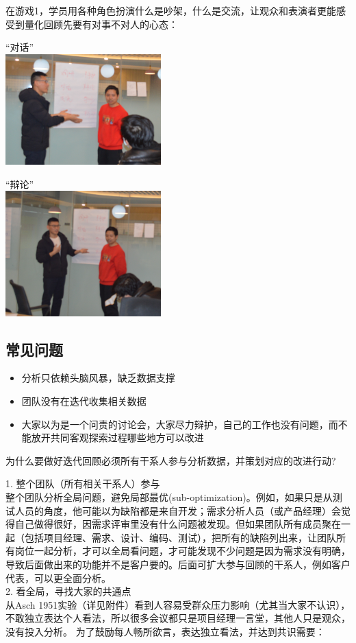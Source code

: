 在游戏1，学员用各种角色扮演什么是吵架，什么是交流，让观众和表演者更能感受到量化回顾先要有对事不对人的心态：

“对话”\\

\includegraphics[width=6cm]{1498.png}

“辩论” \\

\includegraphics[width=6cm]{1499.png}

\hypertarget{ux5e38ux89c1ux95eeux9898}{%
\subsection{常见问题}\label{ux5e38ux89c1ux95eeux9898}}

\begin{itemize}
\tightlist
\item
  分析只依赖头脑风暴，缺乏数据支撑
\item
  团队没有在迭代收集相关数据
\item
  大家以为是一个问责的讨论会，大家尽力辩护，自己的工作也没有问题，而不能放开共同客观探索过程哪些地方可以改进
\end{itemize}

为什么要做好迭代回顾必须所有干系人参与分析数据，并策划对应的改进行动?

1. 整个团队（所有相关干系人）参与\\
整个团队分析全局问题，避免局部最优(sub-optimization)。例如，如果只是从测试人员的角度，他可能以为缺陷都是来自开发；需求分析人员（或产品经理）会觉得自己做得很好，因需求评审里没有什么问题被发现。但如果团队所有成员聚在一起（包括项目经理、需求、设计、编码、测试），把所有的缺陷列出来，让团队所有岗位一起分析，才可以全局看问题，才可能发现不少问题是因为需求没有明确，导致后面做出来的功能并不是客户要的。后面可扩大参与回顾的干系人，例如客户代表，可以更全面分析。\\
2. 看全局，寻找大家的共通点\\
从Asch
1951实验（详见附件）看到人容易受群众压力影响（尤其当大家不认识），不敢独立表达个人看法，所以很多会议都只是项目经理一言堂，其他人只是观众，没有投入分析。
为了鼓励每人畅所欲言，表达独立看法，并达到共识需要：

